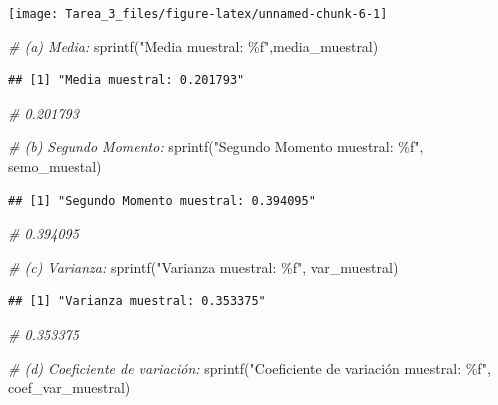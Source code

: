 \documentclass[
]{article}
\newenvironment{Shaded}{\begin{snugshade}}{\end{snugshade}}
\newcommand{\CommentTok}[1]{\textcolor[rgb]{0.56,0.35,0.01}{\textit{#1}}}
\newcommand{\FunctionTok}[1]{\textcolor[rgb]{0.00,0.00,0.00}{#1}}
\newcommand{\NormalTok}[1]{#1}
\newcommand{\StringTok}[1]{\textcolor[rgb]{0.31,0.60,0.02}{#1}}
\begin{document}
\begin{center}\texttt{[image: Tarea\_3\_files/figure-latex/unnamed-chunk-6-1]} \end{center}

\begin{Shaded}
\begin{Highlighting}[]
\CommentTok{\# (a) Media:}
\FunctionTok{sprintf}\NormalTok{(}\StringTok{"Media muestral: \%f"}\NormalTok{,media\_muestral)}
\end{Highlighting}
\end{Shaded}

\begin{verbatim}
## [1] "Media muestral: 0.201793"
\end{verbatim}

\begin{Shaded}
\begin{Highlighting}[]
\CommentTok{\# 0.201793}

\CommentTok{\# (b) Segundo Momento:}
\FunctionTok{sprintf}\NormalTok{(}\StringTok{"Segundo Momento muestral: \%f"}\NormalTok{, semo\_muestal)}
\end{Highlighting}
\end{Shaded}

\begin{verbatim}
## [1] "Segundo Momento muestral: 0.394095"
\end{verbatim}

\begin{Shaded}
\begin{Highlighting}[]
\CommentTok{\# 0.394095}

\CommentTok{\# (c) Varianza:}
\FunctionTok{sprintf}\NormalTok{(}\StringTok{"Varianza muestral: \%f"}\NormalTok{, var\_muestral)}
\end{Highlighting}
\end{Shaded}

\begin{verbatim}
## [1] "Varianza muestral: 0.353375"
\end{verbatim}

\begin{Shaded}
\begin{Highlighting}[]
\CommentTok{\# 0.353375}

\CommentTok{\# (d) Coeficiente de variación:}
\FunctionTok{sprintf}\NormalTok{(}\StringTok{"Coeficiente de variación muestral: \%f"}\NormalTok{, coef\_var\_muestral)}
\end{Highlighting}
\end{Shaded}
\end{document}
